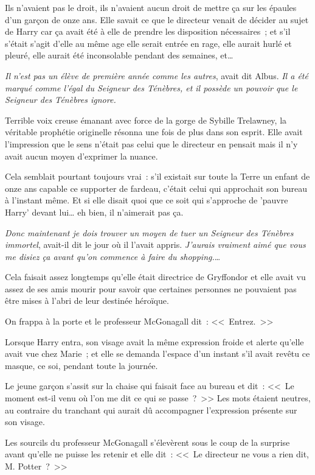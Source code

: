 Ils n'avaient pas le droit, ils n'avaient aucun droit de mettre ça sur les épaules d'un garçon de onze ans. Elle savait ce que le directeur venait de décider au sujet de Harry car ça avait été à elle de prendre les disposition nécessaires~; et s'il s'était s'agit d'elle au même age elle serait entrée en rage, elle aurait hurlé et pleuré, elle aurait été inconsolable pendant des semaines, et…

\emph{Il n'est pas un élève de première année comme les autres}, avait dit Albus. \emph{Il a été marqué comme l'égal du Seigneur des Ténèbres, et il possède un pouvoir que le Seigneur des Ténèbres ignore.}

Terrible voix creuse émanant avec force de la gorge de Sybille Trelawney, la véritable prophétie originelle résonna une fois de plus dans son esprit. Elle avait l'impression que le sens n'était pas celui que le directeur en pensait mais il n’y avait aucun moyen d'exprimer la nuance.

Cela semblait pourtant toujours vrai~: s'il existait sur toute la Terre un enfant de onze ans capable ce supporter de fardeau, c'était celui qui approchait son bureau à l'instant même. Et si elle disait quoi que ce soit qui s'approche de 'pauvre Harry' devant lui… eh bien, il n'aimerait pas ça.

\emph{Donc maintenant je dois trouver un moyen de tuer un Seigneur des Ténèbres immortel}, avait-il dit le jour où il l'avait appris. \emph{J'aurais vraiment aimé que vous me disiez ça avant qu'on commence à faire du shopping.}…

Cela faisait assez longtemps qu'elle était directrice de Gryffondor et elle avait vu assez de ses amis mourir pour savoir que certaines personnes ne pouvaient pas être mises à l'abri de leur destinée héroïque.

On frappa à la porte et le professeur McGonagall dit~: <<~Entrez.~>>

Lorsque Harry entra, son visage avait la même expression froide et alerte qu'elle avait vue chez Marie~; et elle se demanda l'espace d'un instant s'il avait revêtu ce masque, ce soi, pendant toute la journée.

Le jeune garçon s'assit sur la chaise qui faisait face au bureau et dit~: <<~Le moment est-il venu où l'on me dit ce qui se passe~?~>> Les mots étaient neutres, au contraire du tranchant qui aurait dû accompagner l'expression présente sur son visage.

Les sourcils du professeur McGonagall s'élevèrent sous le coup de la surprise avant qu'elle ne puisse les retenir et elle dit~: <<~Le directeur ne vous a rien dit, M. Potter~?~>>

